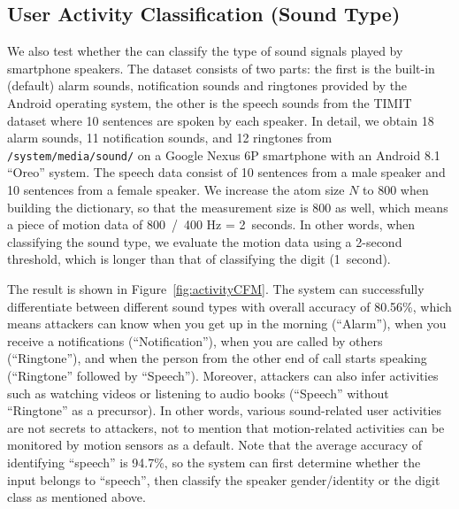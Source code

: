 
\subsection{User Activity Classification (Sound Type)}
We also test whether the {\systemName} can classify the type of sound signals played by smartphone speakers. The dataset consists of two parts: the first is the built-in (default) alarm sounds, notification sounds and ringtones provided by the Android operating system, the other is the speech sounds from the TIMIT~\cite{garofolo1993timit} dataset where 10 sentences are spoken by each speaker.
%
In detail, we obtain 18 alarm sounds, 11 notification sounds, and 12 ringtones from \verb|/system/media/sound/| on a Google Nexus 6P smartphone with an Android 8.1 ``Oreo'' system. The speech data consist of 10 sentences from a male speaker and 10 sentences from a female speaker.  We increase the atom size $N$ to 800 when building the dictionary, so that the measurement size is 800 as well, which means a piece of motion data of 800~/~400 Hz = 2~seconds. In other words, when classifying the sound type, we evaluate the motion data using a 2-second threshold, which is longer than that of classifying the digit (1~second).

The result is shown in Figure~\ref{fig:activityCFM}.
 The {\systemName} system can successfully differentiate between different sound types with overall accuracy of 80.56\%, which means attackers can know when you get up in the morning (``Alarm''),  when you receive a notifications (``Notification''), when you are called by others (``Ringtone''), and when the person from the other end of call starts speaking (``Ringtone'' followed by ``Speech''). Moreover, attackers can also infer activities such as watching videos or listening to audio books (``Speech'' without ``Ringtone'' as a precursor). In other words, various sound-related user activities are not secrets to {\attackName} attackers, not to mention that  motion-related activities can be monitored by motion sensors as a default.
%
Note that the average accuracy of identifying ``speech'' is 94.7\%, so the {\systemName} system can first determine whether the input belongs to ``speech'', then classify the speaker gender/identity or the digit class as mentioned above. 


